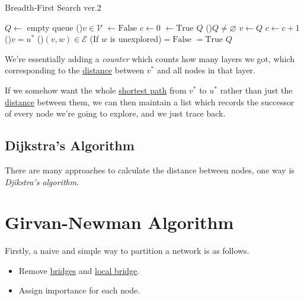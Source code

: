 \begin{algorithm}[H]\label{algo:BFS-2}
	\DontPrintSemicolon
	\caption{Breadth-First Search ver.2}
	\BlankLine
	\(Q\gets \) empty queue
	\For(){\(v\in \mathcal{V} \)}{
		\(\gets \mathrm{False}\)
	}
	\(c\gets 0\) 
	\;
	\(\gets \mathrm{True}\) 
	\(Q\)\;
	\;
	\While(){\(Q\neq \varnothing \)}{
		\(v\gets Q\)\pop{}\;
		\(c\gets c + 1\)\;
		\If(){\(v = u^{\ast} \)}{
		}
		\For(){\((v, w)\in\mathcal{E}\)}{
			\If(If \(w\) is unexplored){\(= \mathrm{False}\)}{
				\(=\mathrm{True}\)
				\(Q\)\;
			}
		}
	}
	\Return{}\;
\end{algorithm}

\begin{intuition}[Counter]
	We're essentially adding a \emph{counter} which counts how many layers we got, which corresponding to the \hyperref[def:distance-between-nodes]{distance} between
	\(v^{\ast} \) and all nodes in that layer.
\end{intuition}

\begin{remark}
	If we somehow want the whole \hyperref[def:shortest-path]{shortest path} from \(v^{\ast} \) to \(u^{\ast} \) rather than just the \hyperref[def:distance-between-nodes]{distance} between them, we can then maintain a list which records the successor of every node we're going to explore, and we just trace back.
\end{remark}

\subsection{Dijkstra's Algorithm}
There are many approaches to calculate the distance between nodes, one way is \emph{Djikstra's algorithm}.

\section{Girvan-Newman Algorithm}
Firstly, a naive and simple way to partition a network is as follows.
\begin{itemize}
	\item Remove \hyperref[def:bridge]{bridges} and \hyperref[def:local-bridge]{local bridge}.
	\item Assign importance for each node.
\end{itemize}


